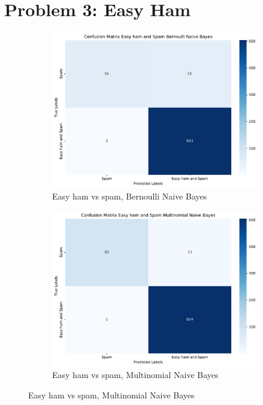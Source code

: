 \documentclass[a4paper]{article}
\begin{document}
\section*{Problem 3: Easy Ham}
\begin{figure}
  \centering
  \begin{subfigure}[a]{\textwidth}
      \centering
      \includegraphics[width=\textwidth]{easy_ham_and_spam_bernoulli_naive_bayes_confusion_matrix.pdf}
      \caption{Easy ham vs spam, Bernoulli Naive Bayes}
      \label{fig:easy_ham_and_spam_bernoulli_naive_bayes_confusion_matrix}
  \end{subfigure}
  \vfill
  \begin{subfigure}[b]{\textwidth}
      \centering
      \includegraphics[width=\textwidth]{easy_ham_and_spam_multinomial_naive_bayes_confusion_matrix.pdf}
      \caption{Easy ham vs spam, Multinomial Naive Bayes}
      \label{fig:easy_ham_and_spam_multinomial_naive_bayes_confusion_matrix}
  \end{subfigure}
\end{figure}
\end{document}
